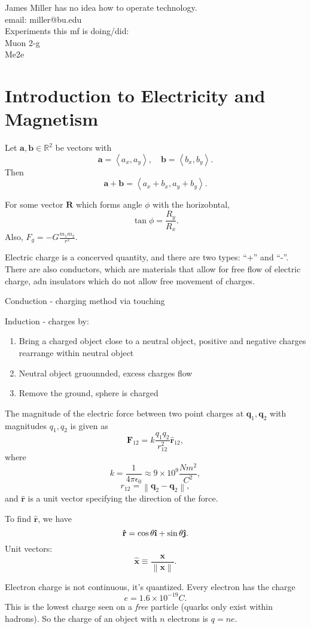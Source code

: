 James Miller has no idea how to operate technology.\\
email: miller@bu.edu\\

Experiments this mf is doing/did:\\
Muon 2-g\\
Me2e

\chapter{Introduction to Electricity and Magnetism}
\begin{prev}
	Let $\mathbf{a},\mathbf{b}\in\mathbb{R}^2$ be vectors with
	\[
		\mathbf{a}=\left<a_x,a_y \right>,\quad \mathbf{b}= \left<b_x,b_y \right>
	.\]
	Then
	\[
		\mathbf{a}+\mathbf{b}=\left<a_x+b_x,a_y+b_y \right>
	.\]

	For some vector $\mathbf{R}$ which forms angle $\phi $ with the horizobntal,
	\[
		\tan \phi =\frac{R_y}{R_x}
	.\]
	Also,
	$F_g = -G\frac{m_1 m_2}{r^2}.$
\end{prev}

Electric charge is a concerved quantity, and there are two types: ``+'' and ``-''.  There are also conductors, which are materials that allow for free flow of electric charge, adn insulators which do not allow free movement of charges.

Conduction - charging method via touching

Induction - charges by:
\begin{enumerate}
	\item Bring a charged object close to a neutral object, positive and negative charges rearrange within neutral object
	\item Neutral object gruounnded, excess charges flow
	\item Remove the ground, sphere is charged
\end{enumerate}

\begin{theorem}\label{thm:1}
	The magnitude of the electric force between two point charges at $\mathbf{q}_1,\mathbf{q}_2$ with magnitudes $q_1,q_2$ is given as
	\[
		\mathbf{F}_{12} = k\frac{q_1 q_2}{r_{12}^2}\mathbf{\hat{r}}_{12}
	,\]
	where
	\[
		k=\frac{1}{4\pi \epsilon_0}\approx 9\times 10^9 \frac{Nm^2}{C^2}
	,\]
	\[
		r_{12}= \left\| \mathbf{q}_2 - \mathbf{q}_2 \right\| 
	,\]
	and $\mathbf{\hat{r}}$ is a unit vector specifying the direction of the force.
\end{theorem}
To find $\mathbf{\hat{r}}$, we have
\[
	\mathbf{\hat{r}}=\cos \theta \hati+\sin \theta \hatj
.\]
Unit vectors:
\[
	\mathbf{\hat{x}}\equiv \frac{\mathbf{x}}{\left\| \mathbf{x} \right\| }
.\]

Electron charge is not continuous, it's quantized. Every electron has the charge
\[
	e=1.6\times 10^{-19}C
.\]
This is the lowest charge seen on a \emph{free} particle (quarks only exist within hadrons). So the charge of an object with $n$ electrons is $q=ne$.
